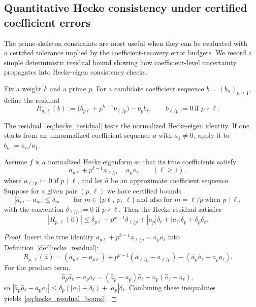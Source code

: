 \subsection{Quantitative Hecke consistency under certified coefficient errors}
\label{sec:hecke_consistency_quantitative}
The prime-skeleton constraints are most useful when they can be evaluated with a certified tolerance implied by the coefficient-recovery error budgets.
We record a simple deterministic residual bound showing how coefficient-level uncertainty propagates into Hecke-eigen consistency checks.

\begin{definition}
\label{def:hecke_residual}
Fix a weight $k$ and a prime $p$. For a candidate coefficient sequence $b=(b_n)_{n\ge 1}$, define the residual
\begin{equation}
\label{eq:hecke_residual}
R_{p,\ell}(b):=\big(b_{p\ell}+p^{k-1}b_{\ell/p}\big)-b_p b_\ell,
\qquad b_{\ell/p}:=0\ \text{if }p\nmid \ell.
\end{equation}
\end{definition}
\begin{remark}
The residual~\eqref{eq:hecke_residual} tests the normalized Hecke-eigen identity. If one starts from an unnormalized coefficient sequence $a$ with $a_1\neq 0$, apply it to $b_n:=a_n/a_1$.
\end{remark}

\begin{proposition}
\label{prop:hecke_residual_bound}
Assume $f$ is a normalized Hecke eigenform so that its true coefficients satisfy
\[
a_{p\ell}+p^{k-1}a_{\ell/p}=a_p a_\ell
\qquad(\ell\ge 1),
\]
where $a_{\ell/p}:=0$ if $p\nmid \ell$,
and let $\widehat a$ be an approximate coefficient sequence. Suppose for a given pair $(p,\ell)$ we have certified bounds
\[
|\widehat a_m-a_m|\le \delta_m
\qquad\text{for }m\in\{p\ell,\ p,\ \ell\}\ \text{and also for }m=\ell/p\ \text{when }p\mid\ell,
\]
with the convention $\delta_{\ell/p}:=0$ if $p\nmid \ell$.
Then the Hecke residual satisfies
\begin{equation}
\label{eq:hecke_residual_bound}
|R_{p,\ell}(\widehat a)|
\le \delta_{p\ell}+p^{k-1}\delta_{\ell/p}+|a_p|\delta_\ell+|a_\ell|\delta_p+\delta_p\delta_\ell.
\end{equation}
\end{proposition}
\begin{proof}
Insert the true identity $a_{p\ell}+p^{k-1}a_{\ell/p}=a_p a_\ell$ into Definition~\ref{def:hecke_residual}:
\[
R_{p,\ell}(\widehat a)
=(\widehat a_{p\ell}-a_{p\ell})+p^{k-1}(\widehat a_{\ell/p}-a_{\ell/p})-(\widehat a_p\widehat a_\ell-a_p a_\ell).
\]
For the product term,
\[
\widehat a_p\widehat a_\ell-a_p a_\ell
=(\widehat a_p-a_p)\widehat a_\ell+a_p(\widehat a_\ell-a_\ell),
\]
so $|\widehat a_p\widehat a_\ell-a_p a_\ell|
\le \delta_p(|a_\ell|+\delta_\ell)+|a_p|\delta_\ell$.
Combining these inequalities yields~\eqref{eq:hecke_residual_bound}.
\end{proof}

